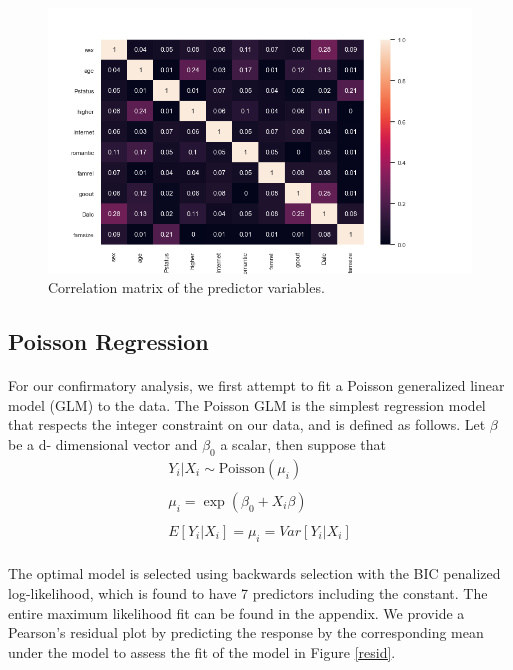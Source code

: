 \documentclass[12pt, titlepage]{article}
\begin{document}
	\begin{figure}[h!]
		\centering
		\includegraphics[width = \textwidth]{fig/Correlation.png}
		\caption{Correlation matrix of the predictor variables.}
		\label{corr}
	\end{figure}
	
	\subsection{Poisson Regression}
	\paragraph{} For our confirmatory analysis, we first attempt to fit a Poisson generalized linear model (GLM) to the data. The Poisson GLM is the simplest regression model that respects the integer constraint on our data, and is defined as follows. Let $\beta$ be a d- dimensional vector and $\beta_0$ a scalar, then suppose that
	\begin{gather*}
	Y_i|X_i \sim \text{Poisson}(\mu_i) \\ \\
	\mu_i = \exp(\beta_0 + X_i\beta) \\ \\
	E[Y_i|X_i] = \mu_i = Var[Y_i|X_i]
	\end{gather*} 
	\paragraph{} The optimal model is selected using backwards selection with the BIC penalized log-likelihood, which is found to have 7 predictors including the constant. The entire maximum likelihood fit can be found in the appendix. We provide a Pearson's residual plot by predicting the response by the corresponding mean under the model to assess the fit of the model in Figure \ref{resid}. 
	
\end{document}
